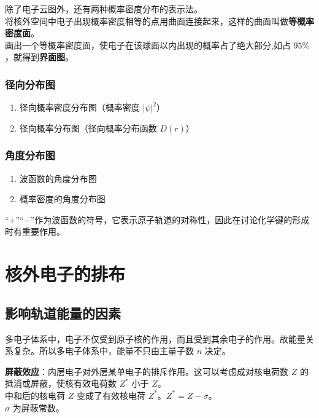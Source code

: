 除了电子云图外，还有两种概率密度分布的表示法。\\
将核外空间中电子出现概率密度相等的点用曲面连接起来，这样的曲面叫做\textbf{等概率密度面}。\\
画出一个等概率密度面，使电子在该球面以内出现的概率占了绝大部分,如占 $95\%$，就得到\textbf{界面图}。

\subsubsection{径向分布图}
\begin{enumerate}
    \item 径向概率密度分布图（概率密度 $\left| \psi \right| ^2$）
    \item 径向概率分布图（径向概率分布函数 $D(r)$）
\end{enumerate}

\subsubsection{角度分布图}
\begin{enumerate}
    \item 波函数的角度分布图
    \item 概率密度的角度分布图
\end{enumerate}

“$+$”“$-$”作为波函数的符号，它表示原子轨道的对称性，因此在讨论化学键的形成时有重要作用。

\section{核外电子的排布}

\subsection{影响轨道能量的因素}
多电子体系中，电子不仅受到原子核的作用，而且受到其余电子的作用。故能量关系复杂。所以多电子体系中，能量不只由主量子数 $n$ 决定。

\textbf{屏蔽效应}：内层电子对外层某单电子的排斥作用。这可以考虑成对核电荷数 $Z$ 的抵消或屏蔽，使核有效电荷数 $Z^*$ 小于 $Z$。\\
中和后的核电荷 $Z$ 变成了有效核电荷 $Z^*$。$Z^* = Z - \sigma$。\\
$\sigma$ 为屏蔽常数。

